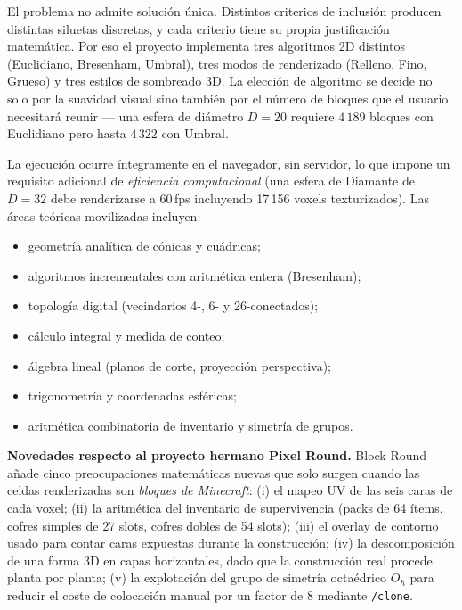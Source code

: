 \documentclass[12pt,a4paper]{scrartcl}
\newcommand{\cmd}[1]{\textcolor{earth}{\texttt{\small #1}}}
\begin{document}
El problema no admite solución única. Distintos criterios de inclusión producen distintas siluetas discretas, y cada criterio tiene su propia justificación matemática. Por eso el proyecto implementa tres algoritmos 2D distintos (Euclidiano, Bresenham, Umbral), tres modos de renderizado (Relleno, Fino, Grueso) y tres estilos de sombreado 3D. La elección de algoritmo se decide no solo por la suavidad visual sino también por el número de bloques que el usuario necesitará reunir --- una esfera de diámetro $D=20$ requiere $4\,189$ bloques con Euclidiano pero hasta $4\,322$ con Umbral.

La ejecución ocurre íntegramente en el navegador, sin servidor, lo que impone un requisito adicional de \emph{eficiencia computacional} (una esfera de Diamante de $D=32$ debe renderizarse a 60\,fps incluyendo 17\,156 voxels texturizados). Las áreas teóricas movilizadas incluyen:
\begin{itemize}[leftmargin=1.3em,itemsep=0.15em,topsep=0.3em]
  \item geometría analítica de cónicas y cuádricas;
  \item algoritmos incrementales con aritmética entera (Bresenham);
  \item topología digital (vecindarios 4-, 6- y 26-conectados);
  \item cálculo integral y medida de conteo;
  \item álgebra lineal (planos de corte, proyección perspectiva);
  \item trigonometría y coordenadas esféricas;
  \item aritmética combinatoria de inventario y simetría de grupos.
\end{itemize}

\textbf{Novedades respecto al proyecto hermano Pixel Round.} Block Round añade cinco preocupaciones matemáticas nuevas que solo surgen cuando las celdas renderizadas son \emph{bloques de Minecraft}: (i) el mapeo UV de las seis caras de cada voxel; (ii) la aritmética del inventario de supervivencia (packs de 64 ítems, cofres simples de 27 slots, cofres dobles de 54 slots); (iii) el overlay de contorno usado para contar caras expuestas durante la construcción; (iv) la descomposición de una forma 3D en capas horizontales, dado que la construcción real procede planta por planta; (v) la explotación del grupo de simetría octaédrico $O_h$ para reducir el coste de colocación manual por un factor de $8$ mediante \cmd{/clone}.

\end{document}
